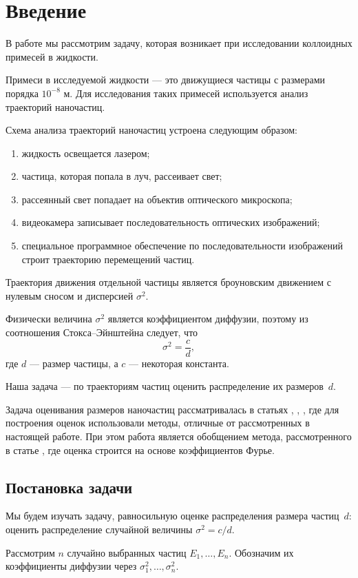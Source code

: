 \documentclass[../paper.tex]{subfiles}
\begin{document}
\section{Введение}
В работе мы рассмотрим задачу, которая возникает при исследовании коллоидных примесей в жидкости.

Примеси в исследуемой жидкости --- это движущиеся частицы с размерами порядка $10^{-8}$ м.
Для исследования таких примесей используется анализ траекторий наночастиц.

Схема анализа траекторий наночастиц устроена следующим образом:
\begin{enumerate}
	\item жидкость освещается лазером;
	\item частица, которая попала в луч, рассеивает свет;
	\item рассеянный свет попадает на объектив оптического микроскопа;
	\item видеокамера записывает последовательность оптических изображений;
	\item специальное программное обеспечение по последовательности изображений строит траекторию перемещений частиц.
\end{enumerate}

Траектория движения отдельной частицы является броуновским движением с нулевым сносом и дисперсией $\sigma^2$.

Физически величина $\sigma^2$ является коэффициентом диффузии, поэтому из соотношения Стокса--Эйнштейна следует, что
\[
	\sigma^2 = \frac{c}{d}
,\] где $d$ --- размер частицы, а $c$ --- некоторая константа.

Наша задача ---  по траекториям частиц оценить распределение их размеров~$d$.

Задача оценивания размеров наночастиц рассматривалась 
в статьях \cite{Wagner2014}, \cite{Matsuura2018}, \cite{fourier-estimation},
где для построения оценок использовали методы, отличные от рассмотренных в настоящей работе.
При этом работа является обобщением метода, рассмотренного в статье \cite{fourier-estimation}, где оценка строится на основе коэффициентов Фурье.
\subsection{Постановка задачи}
Мы будем изучать задачу, равносильную оценке распределения размера частиц~$d$: оценить распределение случайной величины $\sigma^2 = c/d$.

Рассмотрим $n$ случайно выбранных частиц $E_1, \dots, E_n$. 
Обозначим их коэффициенты диффузии через $\sigma_1^2, \dots, \sigma_n^2$. 
\end{document}
